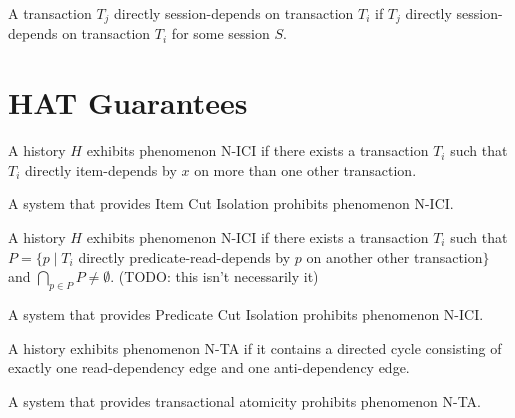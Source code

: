 \begin{definition}
A transaction $T_j$ directly session-depends on transaction $T_i$ if
$T_j$ directly session-depends on transaction $T_i$ for some session
$S$.
\end{definition}

\section{HAT Guarantees}

\begin{definition}
\end{definition}

\begin{definition}
\end{definition}

\begin{definition}
A history $H$ exhibits phenomenon N-ICI if there exists a transaction
$T_i$ such that $T_i$ directly item-depends by $x$ on more than one
other transaction.
\end{definition}

\begin{definition}
A system that provides Item Cut Isolation prohibits phenomenon N-ICI.
\end{definition}

\begin{definition}
A history $H$ exhibits phenomenon N-ICI if there exists a transaction
$T_i$ such that $P= \{p \mid T_i$ directly predicate-read-depends by
$p$ on another other transaction$\}$ and $\bigcap_{p\in P} P \neq
\emptyset$. (TODO: this isn't necessarily it)
\end{definition}

\begin{definition}
A system that provides Predicate Cut Isolation prohibits phenomenon N-ICI.
\end{definition}

\begin{definition}
A history exhibits phenomenon N-TA if it contains a directed cycle
consisting of exactly one read-dependency edge and one anti-dependency
edge.
\end{definition}

\begin{definition}
A system that provides transactional atomicity prohibits phenomenon
N-TA.
\end{definition}

